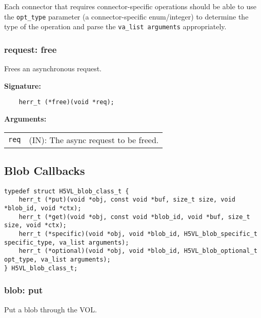Each connector that requires connector-specific operations should be able to use the \texttt{opt\_type} parameter (a connector-specific enum/integer) to determine the type of the operation and parse the \texttt{va\_list arguments} appropriately.

\subsubsection{request: free}
Frees an asynchronous request.

\begin{mdframed}[style=bgbox]
\textbf{Signature:}
\begin{lstlisting}
    herr_t (*free)(void *req);                                                   
\end{lstlisting}

\textbf{Arguments:}\\
\begin{tabular}{l p{13.5cm}}
  \texttt{req} & (IN): The async request to be freed.\\
\end{tabular}
\end{mdframed}



\subsection{Blob Callbacks}
\begin{lstlisting}[caption={Structure for blob callback routines, H5VLconnector.h}, captionpos=b, label={lst:Blobclass}]
typedef struct H5VL_blob_class_t {                                               
    herr_t (*put)(void *obj, const void *buf, size_t size, void *blob_id, void *ctx);
    herr_t (*get)(void *obj, const void *blob_id, void *buf, size_t size, void *ctx);
    herr_t (*specific)(void *obj, void *blob_id, H5VL_blob_specific_t specific_type, va_list arguments);
    herr_t (*optional)(void *obj, void *blob_id, H5VL_blob_optional_t opt_type, va_list arguments);             
} H5VL_blob_class_t; 
\end{lstlisting}

\subsubsection{blob: put}
Put a blob through the VOL.

